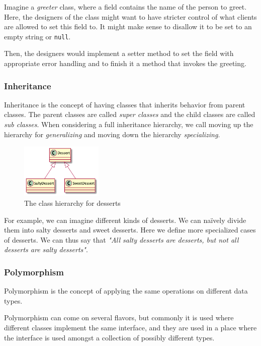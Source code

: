 \documentclass[12pt,letterpaper]{article}
\begin{document}
Imagine a \textit{greeter} class, where a field contains the name of the person to greet. Here, the designers of the class might want to have stricter control of what clients are allowed to set this field to. It might make sense to disallow it to be set to an empty string or \texttt{null}.

Then, the designers would implement a setter method to set the field with appropriate error handling and to finish it a method that invokes the greeting.

\subsubsection*{Inheritance}

Inheritance is the concept of having classes that inherits behavior from parent classes. The parent classes are called \textit{super classes} and the child classes are called \textit{sub classes}. When considering a full inheritance hierarchy, we call moving up the hierarchy for \textit{generalizing} and moving down the hierarchy \textit{specializing}.

\begin{figure}
    \includegraphics[width=0.35\textwidth]{../out/Documents/plantuml/inheritance/inheritance.png}
    \caption{The class hierarchy for desserts}
    \label{uml.classes.desserts}
\end{figure}

For example, we can imagine different kinds of desserts. We can naïvely divide them into salty desserts and sweet desserts. Here we define more specialized cases of desserts. We can thus say that \textit{"All salty desserts are desserts, but not all desserts are salty desserts"}.

\subsubsection*{Polymorphism}

Polymorphism is the concept of applying the same operations on different data types. 

Polymorphism can come on several flavors, but commonly it is used where different classes implement the same interface, and they are used in a place where the interface is used amongst a collection of possibly different types.
\end{document}
